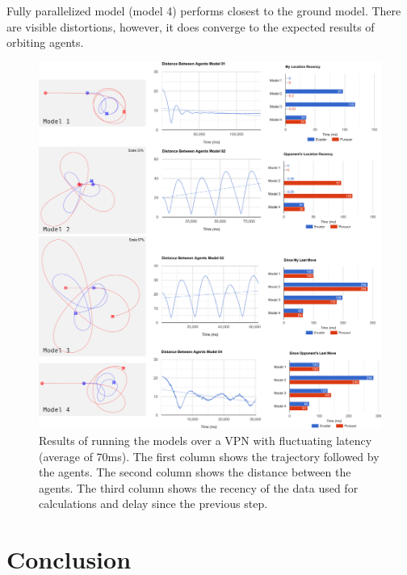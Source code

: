 \documentclass{article}
\begin{document}
Fully parallelized model (model 4) performs closest to the ground model. There are visible distortions, however, it does converge to the expected results of orbiting agents.


\begin{figure}
	\centering
	\includegraphics[width=17.0cm]{charts-vpn}
	\caption{Results of running the models over a VPN with fluctuating latency (average of 70ms). The first column shows the trajectory followed by the agents. The second column shows the distance between the agents. The third column shows the recency of the data used for calculations and delay since the previous step.}\label{fig:charts-vpn}
\end{figure}


\section{Conclusion}

\afterpage{\clearpage}
\end{document}
